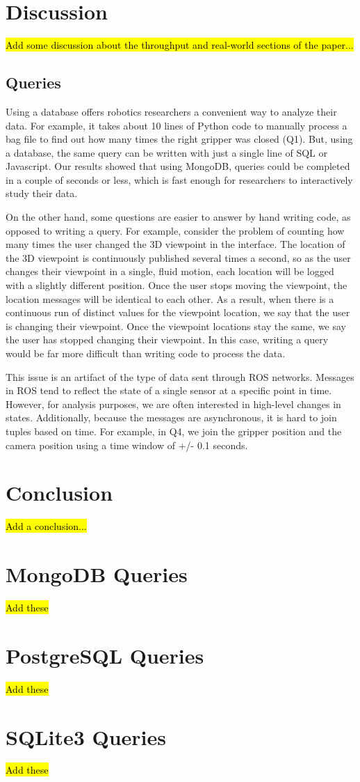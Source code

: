 \documentclass[nocopyrightspace]{acm_proc_article-sp}
\begin{document}
\section{Discussion}
\hl{Add some discussion about the throughput and real-world sections of the paper...}

\subsection{Queries}
Using a database offers robotics researchers a convenient way to analyze their data. For example, it takes about 10 lines of Python code to manually process a bag file to find out how many times the right gripper was closed (Q1). But, using a database, the same query can be written with just a single line of SQL or Javascript. Our results showed that using MongoDB, queries could be completed in a couple of seconds or less, which is fast enough for researchers to interactively study their data.

On the other hand, some questions are easier to answer by hand writing code, as opposed to writing a query. For example, consider the problem of counting how many times the user changed the 3D viewpoint in the interface. The location of the 3D viewpoint is continuously published several times a second, so as the user changes their viewpoint in a single, fluid motion, each location will be logged with a slightly different position. Once the user stops moving the viewpoint, the location messages will be identical to each other. As a result, when there is a continuous run of distinct values for the viewpoint location, we say that the user is changing their viewpoint. Once the viewpoint locations stay the same, we say the user has stopped changing their viewpoint. In this case, writing a query would be far more difficult than writing code to process the data. 

This issue is an artifact of the type of data sent through ROS networks. Messages in ROS tend to reflect the state of a single sensor at a specific point in time. However, for analysis purposes, we are often interested in high-level changes in states. Additionally, because the messages are asynchronous, it is hard to join tuples based on time. For example, in Q4, we join the gripper position and the camera position using a time window of +/- 0.1 seconds.

\section{Conclusion}

\hl{Add a conclusion...}


  

\appendix

\section{MongoDB Queries}
\hl{Add these}

\section{PostgreSQL Queries}
\hl{Add these}

\section{SQLite3 Queries}
\hl{Add these}

\balancecolumns
\end{document}
